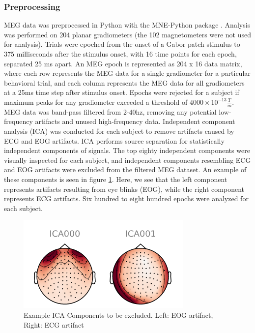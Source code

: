 \documentclass[../main.tex]{subfiles}
\begin{document}
\subsubsection{Preprocessing}
MEG data was preprocessed in Python with the MNE-Python package \citep{mne}. Analysis was performed on 204 planar gradiometers (the 102 magnetometers were not used for analysis). Trials were epoched from the onset of a Gabor patch stimulus to 375 milliseconds after the stimulus onset, with 16 time points for each epoch, separated 25 ms apart. An MEG epoch is represented as 204 x 16 data matrix, where each row represents the MEG data for a single gradiometer for a particular behavioral trial, and each column represents the MEG data for all gradiometers at a 25ms time step after stimulus onset. Epochs were rejected for a subject if maximum peaks for any gradiometer exceeded a threshold of $4000\times10^{-13}  \frac{T}{m}$. MEG data was band-pass filtered from 2-40hz, removing any potential low-frequency artifacts and unused high-frequency data. Independent component analysis (ICA) was conducted for each subject to remove artifacts caused by ECG and EOG artifacts. ICA performs source separation for statistically independent components of signals. The top eighty independent components were visually inspected for each subject, and independent components resembling ECG and EOG artifacts were excluded from the filtered MEG dataset. An example of these components is seen in figure \ref{ica_exclude}. Here, we see that the left component represents artifacts resulting from eye blinks (EOG), while the right component represents ECG artifacts.  Six hundred to eight hundred epochs were analyzed for each subject.

\begin{figure}
    \centering
    \includegraphics{figures/methods/ica_figure.PNG}
    \caption{Example ICA Components to be excluded. Left: EOG artifact, Right: ECG artifact}
    \label{ica_exclude}
\end{figure}
\end{document}
